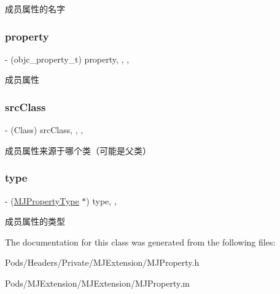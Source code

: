 成员属性的名字 \mbox{\label{interface_m_j_property_a07b2dddaf909a75a2660a049910554dd}} 
\subsubsection{\texorpdfstring{property}{property}}
{\footnotesize\ttfamily -\/ (objc\+\_\+property\+\_\+t) property\hspace{0.3cm}{\ttfamily [read]}, {\ttfamily [write]}, {\ttfamily [nonatomic]}, {\ttfamily [assign]}}

成员属性 \mbox{\label{interface_m_j_property_ae4f79e9cf94a84921a8a2284b560e99e}} 
\subsubsection{\texorpdfstring{src\+Class}{srcClass}}
{\footnotesize\ttfamily -\/ (Class) src\+Class\hspace{0.3cm}{\ttfamily [read]}, {\ttfamily [write]}, {\ttfamily [nonatomic]}, {\ttfamily [assign]}}

成员属性来源于哪个类（可能是父类） \mbox{\label{interface_m_j_property_a19d79469fe3b26031bcbfe38c7728189}} 
\subsubsection{\texorpdfstring{type}{type}}
{\footnotesize\ttfamily -\/ (\mbox{\hyperlink{interface_m_j_property_type}{M\+J\+Property\+Type}} $\ast$) type\hspace{0.3cm}{\ttfamily [read]}, {\ttfamily [nonatomic]}, {\ttfamily [assign]}}

成员属性的类型 

The documentation for this class was generated from the following files\+:\begin{DoxyCompactItemize}
\item 
Pods/\+Headers/\+Private/\+M\+J\+Extension/M\+J\+Property.\+h\item 
Pods/\+M\+J\+Extension/\+M\+J\+Extension/M\+J\+Property.\+m\end{DoxyCompactItemize}
